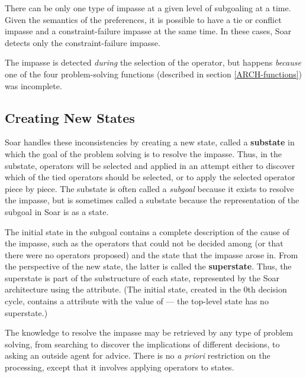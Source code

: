There can be only one type of impasse at a given level of subgoaling at a time. Given the semantics of the preferences, it is possible to have a tie or conflict impasse and a constraint-failure impasse at the same time.  In these cases, Soar detects only the constraint-failure impasse.

The impasse is detected \textit{during} the selection of the operator, but happens \textit{because} one of the four problem-solving functions (described in section \ref{ARCH-functions}) was incomplete.

\subsection{Creating New States}

Soar handles these inconsistencies by creating a new state, called a \textbf{substate} in which the goal of the problem solving is to resolve the impasse.  Thus, in the substate, operators will be selected and applied in an attempt either to discover which of the tied operators should be selected, or to apply the selected operator piece by piece.  The substate is often called a \emph{subgoal} because it exists to resolve the impasse, but is sometimes called a substate because the representation of the subgoal in Soar is as a state.

The initial state in the subgoal contains a complete description of the cause of the impasse, such as the operators that could not be decided among (or that there were no operators proposed) and the state that the impasse arose in. From the perspective of the new state, the latter is called the \textbf{superstate}. Thus, the superstate is part of the substructure of each state, represented by the Soar architecture using the  attribute. (The initial state, created in the 0th decision cycle, contains a  attribute with the value of  --- the top-level state has no superstate.)

The knowledge to resolve the impasse may be retrieved by any type of problem solving, from searching to discover the implications of different decisions, to asking an outside agent for advice. There is no \emph{a priori} restriction on the processing, except that it involves applying operators to states.

\begin{figure}
	\label{fig:stack1}
\end{figure}

